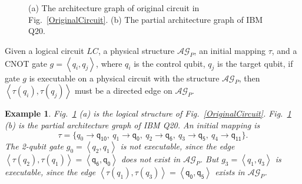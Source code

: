 \documentclass[journal]{IEEEtran}
\newtheorem{example}{Example}[section]
\begin{document}
\begin{figure}[htbp]
\begin{center}
{
			}
\end{center}
	
	\caption{(a) The architecture graph of original circuit in Fig.~\ref{OriginalCircuit}. (b) The partial architecture graph of IBM Q20.}
	\label{LAGPAG}
\end{figure}
	

Given a logical circuit $LC$, a physical structure $\mathcal{AG}_{P}$, an initial mapping $\tau$, and a CNOT gate $g=\left \langle \textit{q}_\textit{i},\textit{q}_\textit{j}\right \rangle $, where $\textit{q}_\textit{i}$ is the control qubit, $\textit{q}_\textit{j}$ is the target qubit,
if gate $g$ is executable on a physical circuit with the structure $\mathcal{AG}_{P}$, then
$\left \langle\tau(\textit{q}_\textit{i}),\tau(\textit{q}_\textit{j})\right \rangle $ 
must be a directed edge on $\mathcal{AG}_{P}$.


\begin{example}
	Fig.~\ref{LAGPAG} (a) is the logical structure of Fig.~\ref{OriginalCircuit}. 
	Fig.~\ref{LAGPAG} (b) is the partial architecture graph of IBM Q20. An initial mapping is 
	$$\tau=\{\textit{q}_\textit{0}\rightarrow  \textsf{q}_{\textsf{10}},\ \textit{q}_\textit{1}\rightarrow \textsf{q}_{\textsf{0}},\ 
	\textit{q}_\textit{2}\rightarrow  \textsf{q}_{\textsf{6}},\ \textit{q}_\textit{3}\rightarrow  \textsf{q}_{\textsf{5}},\ \textit{q}_\textit{4}\rightarrow  \textsf{q}_{\textsf{11}}\} .$$
The 2-qubit gate	$g_{0}=\left \langle \textit{q}_\textit{2},\textit{q}_\textit{1}\right \rangle $ is not executable, since the edge $\left \langle \tau(\textit{q}_\textit{2}),\tau(\textit{q}_\textit{1})\right \rangle =\left \langle \textsf{q}_{\textsf{6}},\textsf{q}_{\textsf{0}}\right \rangle $ does not exist in $\mathcal{AG}_{P}$.
	But $g_{3}=\left \langle \textit{q}_\textit{1},\textit{q}_\textit{3}\right \rangle $ is executable, since 
	the edge $\left \langle \tau(\textit{q}_\textit{1}),\tau(\textit{q}_\textit{3})\right \rangle =\left \langle \textsf{q}_{\textsf{0}},\textsf{q}_{\textsf{5}}\right \rangle $  exists in $\mathcal{AG}_{P}$.
\end{example}
\end{document}
